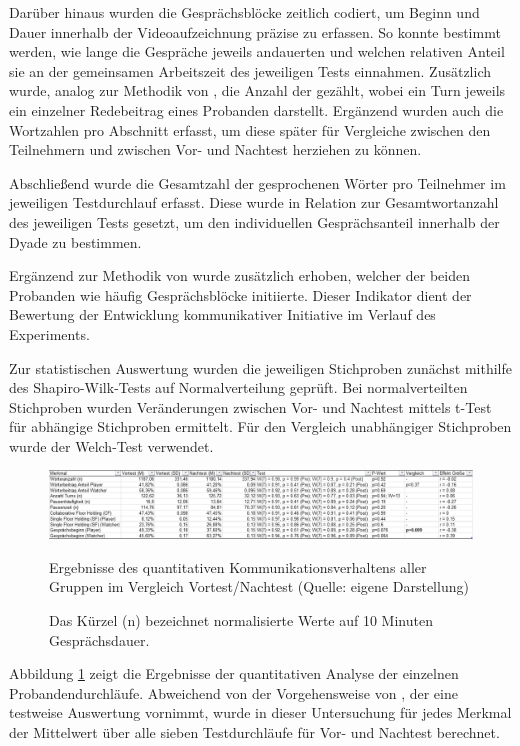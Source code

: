 Darüber hinaus wurden die Gesprächsblöcke zeitlich codiert, um Beginn und Dauer innerhalb der Videoaufzeichnung präzise zu erfassen. So konnte bestimmt werden, wie lange die Gespräche jeweils andauerten und welchen relativen Anteil sie an der gemeinsamen Arbeitszeit des jeweiligen Tests einnahmen. Zusätzlich wurde, analog zur Methodik von \citeauthor{nasir_effect_2015}, die Anzahl der  gezählt, wobei ein Turn jeweils ein einzelner Redebeitrag eines Probanden darstellt. Ergänzend wurden auch die Wortzahlen pro Abschnitt erfasst, um diese später für Vergleiche zwischen den Teilnehmern und zwischen Vor- und Nachtest herziehen zu können.

Abschließend wurde die Gesamtzahl der gesprochenen Wörter pro Teilnehmer im jeweiligen Testdurchlauf erfasst. Diese wurde in Relation zur Gesamtwortanzahl des jeweiligen Tests gesetzt, um den individuellen Gesprächsanteil innerhalb der Dyade zu bestimmen.

Ergänzend zur Methodik von \citeauthor{nasir_effect_2015} wurde zusätzlich erhoben, welcher der beiden Probanden wie häufig Gesprächsblöcke initiierte. Dieser Indikator dient der Bewertung der Entwicklung kommunikativer Initiative im Verlauf des Experiments.

Zur statistischen Auswertung wurden die jeweiligen Stichproben zunächst mithilfe des Shapiro-Wilk-Tests auf Normalverteilung geprüft. Bei normalverteilten Stichproben wurden Veränderungen zwischen Vor- und Nachtest mittels t-Test für abhängige Stichproben ermittelt. Für den Vergleich unabhängiger Stichproben wurde der Welch-Test verwendet.

\begin{figure}[ht]
\centering
\includegraphics[width=1\linewidth]{content/pictures/quantitative_communication_results.png}
\caption{Ergebnisse des quantitativen Kommunikationsverhaltens aller Gruppen im Vergleich Vortest/Nachtest (Quelle: eigene Darstellung)}
\caption*{\footnotesize Das Kürzel (n) bezeichnet normalisierte Werte auf 10 Minuten Gesprächsdauer.}
\label{fig:communication-results}
\end{figure}

 Abbildung \ref{fig:communication-results} zeigt die Ergebnisse der quantitativen Analyse der einzelnen Probandendurchläufe. Abweichend von der Vorgehensweise von \citeauthor{nasir_effect_2015}, der eine testweise Auswertung vornimmt, wurde in dieser Untersuchung für jedes Merkmal der Mittelwert über alle sieben Testdurchläufe für Vor- und Nachtest berechnet.

